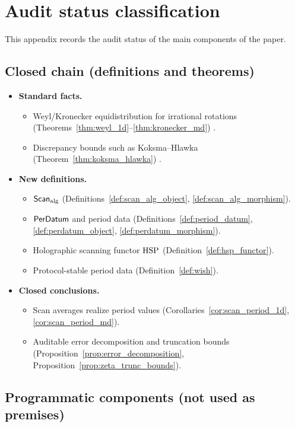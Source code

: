
\section{Audit status classification}
\label{app:audit_table}

This appendix records the audit status of the main components of the paper.

\subsection{Closed chain (definitions and theorems)}

\begin{itemize}
\item \textbf{Standard facts.}
\begin{itemize}
\item Weyl/Kronecker equidistribution for irrational rotations (Theorems~\ref{thm:weyl_1d}--\ref{thm:kronecker_md}) \cite{Weyl1916,KuipersNiederreiter1974}.
\item Discrepancy bounds such as Koksma--Hlawka (Theorem~\ref{thm:koksma_hlawka}) \cite{KuipersNiederreiter1974}.
\end{itemize}
\item \textbf{New definitions.}
\begin{itemize}
\item $\mathsf{Scan}_{\mathrm{alg}}$ (Definitions~\ref{def:scan_alg_object}, \ref{def:scan_alg_morphism}).
\item $\mathsf{PerDatum}$ and period data (Definitions~\ref{def:period_datum}, \ref{def:perdatum_object}, \ref{def:perdatum_morphism}).
\item Holographic scanning functor $\mathrm{HSP}$ (Definition~\ref{def:hsp_functor}).
\item Protocol-stable period data (Definition~\ref{def:wish}).
\end{itemize}
\item \textbf{Closed conclusions.}
\begin{itemize}
\item Scan averages realize period values (Corollaries~\ref{cor:scan_period_1d}, \ref{cor:scan_period_md}).
\item Auditable error decomposition and truncation bounds (Proposition~\ref{prop:error_decomposition}, Proposition~\ref{prop:zeta_trunc_bounds}).
\end{itemize}
\end{itemize}

\subsection{Programmatic components (not used as premises)}

